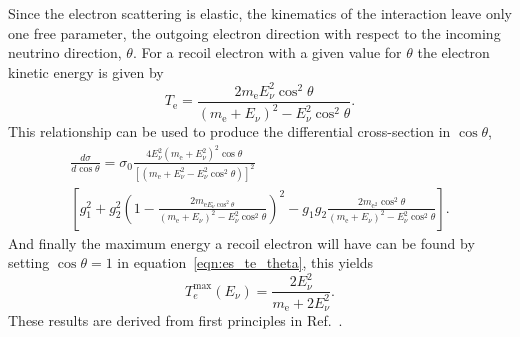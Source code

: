 Since the electron scattering is elastic, the kinematics of the interaction
leave only one free parameter, the outgoing electron direction with respect
to the incoming neutrino direction, $\theta$.
For a recoil electron with a given value for $\theta$ the electron kinetic energy is
given by
\begin{equation}
    T_{\mathrm{e}}=\frac{2m_{\mathrm{e}}E_{\nu}^{2}\cos^{2}\theta}{(m_{\mathrm{e}}+E_{\nu})^2 - E_{\nu}^{2}\cos^2\theta}\text{.}
    \label{eqn:es_te_theta}
\end{equation}
This relationship can be used to produce the differential cross-section in $\cos\theta$,
\begin{multline}
\frac{d\sigma}{d\cos\theta}=\sigma_{0}\frac{4E_{\nu}^{2}(m_{\mathrm{e}}+E_{\nu}^{2})^2\cos\theta}{\left[(m_{\mathrm{e}}+E_{\nu}^{2} -E_{\nu}^{2}\cos^2\theta)\right]^2}\\
    \left[g_{1}^{2} + g_{2}^{2}\left(1 - \frac{2m_{\mathrm{e}E_{\nu}\cos^{2}\theta}}{(m_{\mathrm{e}}+E_{\nu})^2 -E_{\nu}^{2}\cos^2\theta} \right)^{2} - g_{1}g_{2}\frac{2m_{\mathrm{e}^{2}}\cos^{2}\theta}{(m_{\mathrm{e}}+E_{\nu})^{2}-E_{\nu}^{2}\cos^{2}\theta}\right]
    \text{.}
\end{multline}
And finally the maximum energy a recoil electron will have can be found by
setting $\cos\theta=1$ in equation~\eqref{eqn:es_te_theta}, this yields
\begin{equation}
    T_{e}^{\max}(E_\nu) = \frac{2E_{\nu}^{2}}{m_{\mathrm{e}}+ 2E_{\nu}^{2} }\text{.}
\end{equation}
These results are derived from first principles in Ref.~\citep{giuntikim}.

